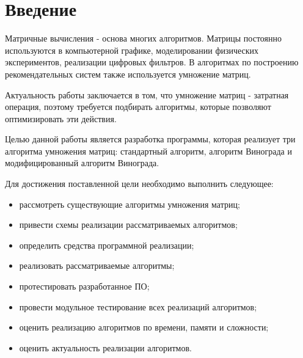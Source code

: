 
\chapter*{Введение}
Матричные вычисления - основа многих алгоритмов. Матрицы постоянно используются в компьютерной графике,
моделировании физических экспериментов, реализации цифровых фильтров. 
В алгоритмах по построению рекомендательных систем также используется умножение матриц. 

Актуальность работы заключается в том, что умножение матриц - затратная операция, поэтому требуется
подбирать алгоритмы, которые позволяют оптимизировать эти действия.

Целью данной работы является разработка программы, которая реализует три алгоритма умножения матриц:
стандартный алгоритм, алгоритм Винограда и модифицированный алгоритм Винограда.

Для достижения поставленной цели необходимо выполнить следующее:
\begin{itemize}
	\item рассмотреть существующие алгоритмы умножения матриц;
	\item привести схемы реализации рассматриваемых алгоритмов;
	\item определить средства программной реализации;
	\item реализовать рассматриваемые алгоритмы;
	\item протестировать разработанное ПО;
	\item провести модульное тестирование всех реализаций алгоритмов;
	\item оценить реализацию алгоритмов по времени, памяти и сложности;
	\item оценить актуальность реализации алгоритмов.
\end{itemize}